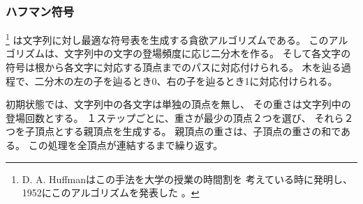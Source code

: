 \begin{comment}
\index{Huffman coding}

\subsubsection{Huffman coding}

\key{Huffman coding}\footnote{D. A. Huffman discovered this method
when solving a university course assignment
and published the algorithm in 1952 \cite{huf52}.} is a greedy algorithm
that constructs an optimal code for
compressing a given string.
The algorithm builds a binary tree
based on the frequencies of the characters
in the string,
and each character's codeword can be read
by following a path from the root to
the corresponding node.
A move to the left corresponds to bit 0,
and a move to the right corresponds to bit 1.
\end{comment}


\subsubsection{ハフマン符号}

\footnote{D. A. Huffmanはこの手法を大学の授業の時間割を
考えている時に発明し、1952にこのアルゴリズムを発表した \cite{huf52}。}
は文字列に対し最適な符号表を生成する貪欲アルゴリズムである。
このアルゴリズムは、文字列中の文字の登場頻度に応じ二分木を作る。
そして各文字の符号は根から各文字に対応する頂点までのパスに対応付けられる。
木を辿る過程で、二分木の左の子を辿るとき0、右の子を辿るとき1に対応付けられる。

\begin{comment}
Initially, each character of the string is
represented by a node whose weight is the
number of times the character occurs in the string.
Then at each step two nodes with minimum weights
are combined by creating
a new node whose weight is the sum of the weights
of the original nodes.
The process continues until all nodes have been combined.

Next we will see how Huffman coding creates
the optimal code for the string
\texttt{AABACDACA}.
Initially, there are four nodes that correspond
to the characters of the string:
\end{comment}

初期状態では、文字列中の各文字は単独の頂点を無し、
その重さは文字列中の登場回数とする。
１ステップごとに、重さが最少の頂点２つを選び、
それら２つを子頂点とする親頂点を生成する。
親頂点の重さは、子頂点の重さの和である。
この処理を全頂点が連結するまで繰り返す。

